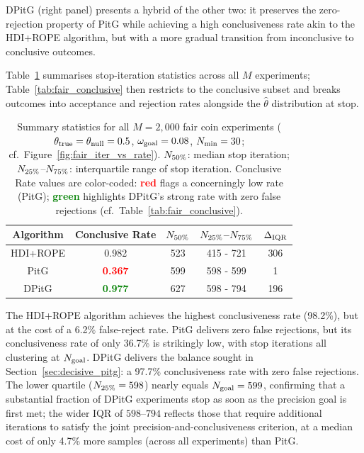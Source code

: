 DPitG (right panel) presents a hybrid of the other two: it preserves the zero-rejection
property of PitG while achieving a high conclusiveness rate akin to the HDI+ROPE algorithm, but with
a more gradual transition from inconclusive to conclusive outcomes.

Table~\ref{tab:fair_overall} summarises stop-iteration statistics across all $M$ experiments;
Table~\ref{tab:fair_conclusive} then restricts to the conclusive subset and breaks outcomes
into acceptance and rejection rates alongside the $\hat{\theta}$ distribution at stop.

\begin{table}[h!]
  \begin{center}
  \begin{tabular}{c|c|c|c|c}
    \hline
    Algorithm &  Conclusive Rate  & $N_{\rm 50\%}$ & $N_{\rm 25\%}$--$N_{\rm 75\%}$ & $\Delta_{\rm IQR}$\\
    \hline
    HDI+ROPE & 0.982 & 523 & 415 - 721& 306  \\
    PitG     & \textcolor{red}{\textbf{0.367}}  & 599 & 598 - 599& 1 \\
    DPitG    & \textcolor{green}{\textbf{0.977}}  & 627 & 598 - 794& 196 \\
    \hline
  \end{tabular}
  \caption{Summary statistics for all $M=2{,}000$ fair coin experiments
  ($\theta_{\rm true}=\theta_{\rm null}=0.5$, $\omega_{\rm goal}=0.08$, $N_{\rm min}=30$;
  cf.\ Figure~\ref{fig:fair_iter_vs_rate}).
  $N_{\rm 50\%}$: median stop iteration;
  $N_{\rm 25\%}$--$N_{\rm 75\%}$: interquartile range of stop iteration.
  Conclusive Rate values are color-coded: \textcolor{red}{\textbf{red}} flags a
  concerningly low rate (PitG); \textcolor{green}{\textbf{green}} highlights DPitG's
  strong rate with zero false rejections (cf.\ Table~\ref{tab:fair_conclusive}).}
  \label{tab:fair_overall}
\end{center}
\end{table}

The HDI+ROPE algorithm achieves the highest conclusiveness rate (98.2\%), but at the cost of a 6.2\%
false-reject rate. PitG delivers zero false rejections, but its conclusiveness rate of
only 36.7\% is strikingly low, with stop iterations all clustering at $N_{\rm goal}$.
DPitG delivers the balance sought in Section~\ref{sec:decisive_pitg}: a 97.7\%
conclusiveness rate with zero false
rejections. The lower quartile ($N_{\rm 25\%}=598$) nearly equals $N_{\rm goal}=599$,
confirming that a substantial fraction of DPitG experiments stop as soon as the
precision goal is first met; the wider IQR of $598$--$794$ reflects those that
require additional iterations to satisfy the joint precision-and-conclusiveness
criterion, at a median cost of only 4.7\% more samples (across all experiments)
than PitG.


